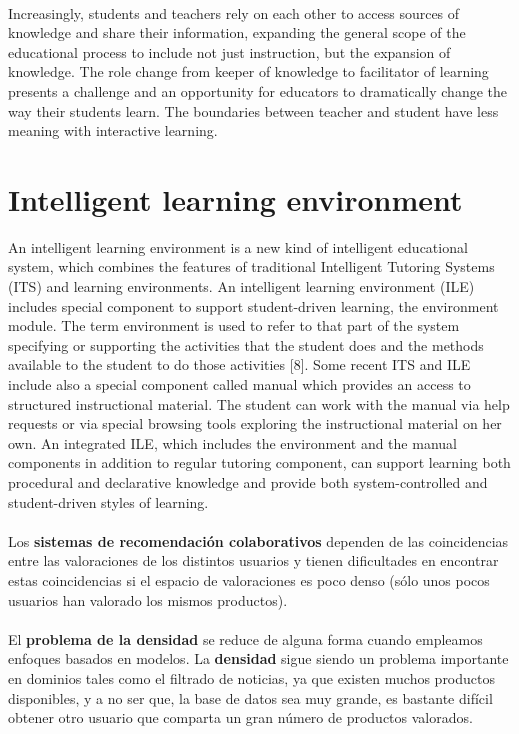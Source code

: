 \documentclass[12pt,letterpaper,oneside] {memoir}
\begin{document}
\paragraph{}
Increasingly, students and teachers rely on each other to access sources of knowledge and share their information, expanding the general scope of the educational process to include not just instruction, but the expansion of knowledge. The role change from keeper of knowledge to facilitator of learning presents a challenge and an opportunity for educators to dramatically change the way their students learn. The boundaries between teacher and student have less meaning with interactive learning.
\section{Intelligent learning environment}
An intelligent learning environment is a new kind of intelligent educational system, which combines the features of traditional Intelligent Tutoring Systems (ITS) and learning environments. An intelligent learning environment (ILE) includes special component to support student-driven learning, the environment module. The term environment is used to refer to that part of the system specifying or supporting the activities that the student does and the methods available to the student to do those activities [8]. Some recent ITS and ILE include also a special component called manual which provides an access to structured instructional material. The student can work with the manual via help requests or via special browsing tools exploring the instructional material on her own. An integrated ILE, which includes the environment and the manual components in addition to regular tutoring component, can support learning both procedural and declarative knowledge and provide both system-controlled and student-driven styles of learning.
\paragraph{}
Los \textbf{sistemas de recomendación colaborativos} dependen de las coincidencias entre las valoraciones de los distintos usuarios y tienen dificultades en encontrar estas coincidencias si el espacio de valoraciones es poco denso (sólo unos pocos usuarios han valorado los mismos productos). 
\paragraph{}
El \textbf{problema de la densidad} se reduce de alguna forma cuando empleamos enfoques basados en modelos. La \textbf{densidad} sigue siendo un problema importante en dominios tales como el filtrado de noticias, ya que existen muchos productos disponibles, y a no ser que, la base de datos sea muy grande, es bastante difícil obtener otro usuario que comparta un gran número de productos valorados.
\end{document}
